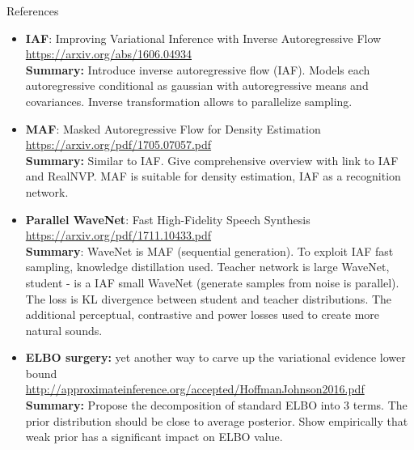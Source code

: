 \begin{frame}{References}
{\tiny
\begin{itemize}
	
	\item \textbf{IAF}: Improving Variational Inference with Inverse Autoregressive Flow \\
	\href{https://arxiv.org/abs/1606.04934}{https://arxiv.org/abs/1606.04934} \\
	\textbf{Summary:} Introduce inverse autoregressive flow (IAF). Models each autoregressive conditional as gaussian with autoregressive means and covariances. Inverse transformation allows to parallelize sampling.
	
	\item \textbf{MAF}: Masked Autoregressive Flow for Density Estimation \\ 
	\href{https://arxiv.org/pdf/1705.07057.pdf}{https://arxiv.org/pdf/1705.07057.pdf} \\
	\textbf{Summary:} Similar to IAF. Give comprehensive overview with link to IAF and RealNVP.  MAF is suitable for density estimation, IAF as a recognition network.
	
	\item \textbf{Parallel WaveNet}: Fast High-Fidelity Speech Synthesis \\
	\href{https://arxiv.org/pdf/1711.10433.pdf}{https://arxiv.org/pdf/1711.10433.pdf} \\
	\textbf{Summary}: WaveNet is MAF (sequential generation). To exploit IAF fast sampling, knowledge distillation used. Teacher network is large WaveNet, student - is a IAF small WaveNet (generate samples from noise is parallel). The loss is KL divergence between student and teacher distributions. The additional perceptual, contrastive and power losses used to create more natural sounds.
	
	\item \textbf{ELBO surgery:} yet another way to carve up the variational evidence lower bound \\
	\href{http://approximateinference.org/accepted/HoffmanJohnson2016.pdf}{http://approximateinference.org/accepted/HoffmanJohnson2016.pdf} \\
	\textbf{Summary:} Propose the decomposition of standard ELBO into 3 terms. The prior distribution should be close to average posterior. Show empirically that weak prior has a significant impact on ELBO value.
\end{itemize}
}
\end{frame}
 